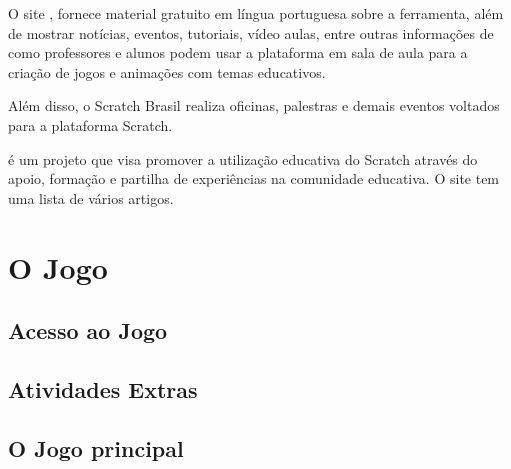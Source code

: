 \documentclass[12pt,fleqn]{book} %
\begin{document}
{O site , fornece material gratuito em língua portuguesa sobre a ferramenta, além de mostrar notícias, eventos, tutoriais, vídeo aulas, entre outras informações de como professores e alunos podem usar a plataforma em sala de aula para a criação de jogos e animações com temas educativos.

Além disso, o Scratch Brasil realiza oficinas, palestras e demais eventos voltados para a plataforma Scratch.

 é um projeto que visa promover a utilização educativa do Scratch através do apoio, formação e partilha de experiências na comunidade educativa. O site tem uma lista de vários artigos. 





\lipsum[1-2] %

\chapter{O Jogo }
\lipsum[1-7] %

\section{Acesso ao Jogo}
\lipsum[1-7] %

\section{Atividades Extras}
\lipsum[1-7] %

\section{O Jogo principal}
\lipsum[1-7] %

}
\end{document}

